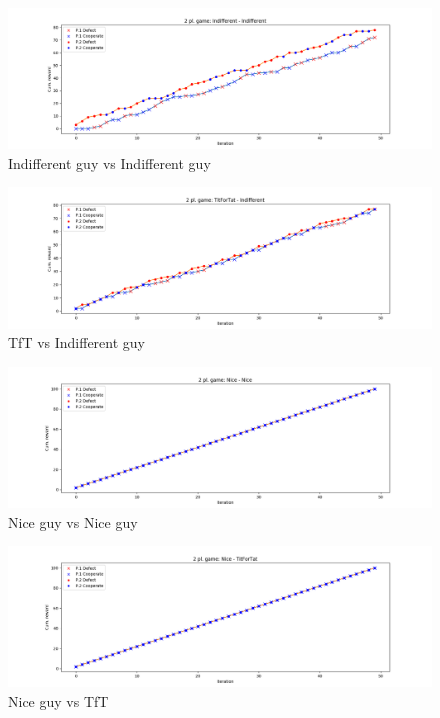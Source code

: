 \documentclass[journal,a4paper,10pt,twoside]{IEEEtran}
\begin{document}
\begin{figure}
    \centering
    \includegraphics[width=1\columnwidth]{../img_v1/idp2p-rewards-Indifferent-Indifferent.png}
    \caption{Indifferent guy vs Indifferent guy}
    \label{fig:indiffvsindiff}
\end{figure}

\begin{figure}
    \centering
    \includegraphics[width=1\columnwidth]{../img_v1/idp2p-rewards-TitForTat-Indifferent.png}
    \caption{TfT vs Indifferent guy}
    \label{fig:tftvsindiff}
\end{figure}

\begin{figure}
    \centering
    \includegraphics[width=1\columnwidth]{../img_v1/idp2p-rewards-Nice-Nice.png}
    \caption{Nice guy vs Nice guy}
    \label{fig:nicevsnice}
\end{figure}

\begin{figure}
    \centering
    \includegraphics[width=1\columnwidth]{../img_v1/idp2p-rewards-Nice-TitForTat.png}
    \caption{Nice guy vs TfT}
    \label{fig:nicevstft}
\end{figure}
\end{document}
